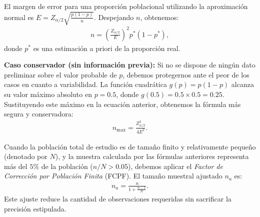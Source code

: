 \begin{teorema}
	El margen de error para una proporción poblacional utilizando la aproximación normal es $E = Z_{\alpha/2} \sqrt{\frac{p(1-p)}{n}}$. Despejando $n$, obtenemos:
	\begin{align}
		n = \left( \frac{Z_{\alpha/2}}{E} \right)^2 p^* (1 - p^*),
		\label{eq:n_proporcion}
	\end{align}
	donde $p^*$ es una estimación a priori de la proporción real.

	\textbf{Caso conservador (sin información previa):} Si no se dispone de ningún dato preliminar sobre el valor probable de $p$, debemos protegernos ante el peor de los casos en cuanto a variabilidad. La función cuadrática $g(p) = p(1-p)$ alcanza su valor máximo absoluto en $p = 0.5$, donde $g(0.5) = 0.5 \times 0.5 = 0.25$. Sustituyendo este máximo en la ecuación anterior, obtenemos la fórmula más segura y conservadora:
	\begin{align}
		n_{\text{max}} = \frac{Z_{\alpha/2}^2}{4 E^2}.
		\label{eq:n_conservador}
	\end{align}
\end{teorema}

\begin{observacion}
	Cuando la población total de estudio es de tamaño finito y relativamente pequeño (denotado por $N$), y la muestra calculada por las fórmulas anteriores representa más del $5\%$ de la población ($n / N > 0.05$), debemos aplicar el \emph{Factor de Corrección por Población Finita} (FCPF). El tamaño muestral ajustado $n_a$ es:
	\begin{align}
		n_a = \frac{n}{1 + \frac{n-1}{N}}.
	\end{align}
	Este ajuste reduce la cantidad de observaciones requeridas sin sacrificar la precisión estipulada.
\end{observacion}

